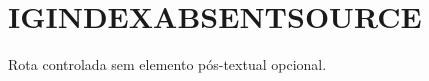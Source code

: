 \documentclass{abntexto-ufc}
\begin{document}
\textual
\section{IGINDEXABSENTSOURCE}
Rota controlada sem elemento pós-textual opcional.

\ufcPrintIndex
\end{document}
